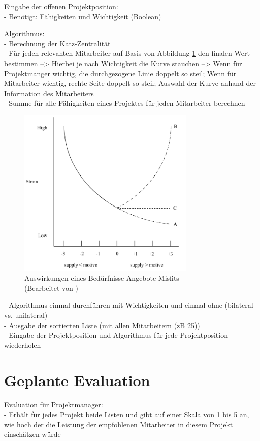 Eingabe der offenen Projektposition:\\
- Benötigt: Fähigkeiten und Wichtigkeit (Boolean)

Algorithmus:\\
- Berechnung der Katz-Zentralität\\
- Für jeden relevanten Mitarbeiter auf Basis von Abbildung \ref{fig:methodik:abb2} den finalen Wert bestimmen --> Hierbei je nach Wichtigkeit die Kurve stauchen --> Wenn für Projektmanger wichtig, die durchgezogene Linie doppelt so steil; Wenn für Mitarbeiter wichtig, rechte Seite doppelt so steil; Auswahl der Kurve anhand der Information des Mitarbeiters\\
- Summe für alle Fähigkeiten eines Projektes für jeden Mitarbeiter berechnen

\begin{figure}[h]
	\centering
	\includegraphics[width=0.75\textwidth]{gfx/ueberschuss_supply_motive.png}
	\caption{Auswirkungen eines Bedürfnisse-Angebote Misfits \cite[S. 23]{edwards:2008}\\(Bearbeitet von \myName)}
	\label{fig:methodik:abb2}
\end{figure}

- Algorithmus einmal durchführen mit Wichtigkeiten und einmal ohne (bilateral vs. unilateral)\\
- Ausgabe der sortierten Liste (mit allen Mitarbeitern (zB 25))\\
- Eingabe der Projektposition und Algorithmus für jede Projektposition wiederholen

\section{Geplante Evaluation}
\label{ch:methodik:evaluation}
Evaluation für Projektmanager:\\
- Erhält für jedes Projekt beide Listen und gibt auf einer Skala von 1 bis 5 an, wie hoch der die Leistung der empfohlenen Mitarbeiter in diesem Projekt einschätzen würde

